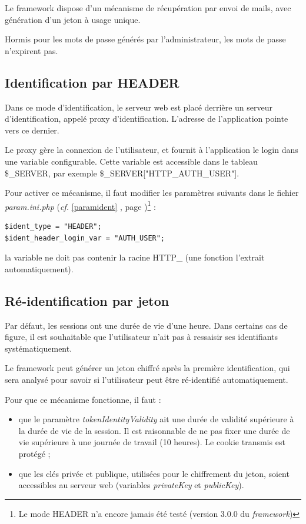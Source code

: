 Le framework dispose d'un mécanisme de récupération par envoi de mails, avec génération d'un jeton à usage unique.

Hormis pour les mots de passe générés par l'administrateur, les mots de passe n'expirent pas.

\subsection{Identification par HEADER}

Dans ce mode d'identification, le serveur web est placé derrière un serveur d'identification, appelé proxy d'identification. L'adresse de l'application pointe vers ce dernier. 

Le proxy gère la connexion de l'utilisateur, et fournit à l'application le login dans une variable configurable. Cette variable est accessible dans le tableau \$\_SERVER, par exemple \$\_SERVER["HTTP\_AUTH\_USER"].

Pour activer ce mécanisme, il faut modifier les paramètres suivants dans le fichier \textit{param.ini.php} (\textit{cf.} \ref{paramident} \textit{}, page \pageref{paramident})\footnote{Le mode HEADER n'a encore jamais été testé (version 3.0.0 du \textit{framework})} :
\begin{lstlisting}
$ident_type = "HEADER";
$ident_header_login_var = "AUTH_USER";
\end{lstlisting}

la variable ne doit pas contenir la racine HTTP\_ (une fonction l'extrait automatiquement).

\subsection{Ré-identification par jeton}

Par défaut, les sessions ont une durée de vie d'une heure. Dans certains cas de figure, il est souhaitable que l'utilisateur n'ait pas à ressaisir ses identifiants systématiquement.

Le framework peut générer un jeton chiffré après la première identification, qui sera analysé pour savoir si l'utilisateur peut être ré-identifié automatiquement.

Pour que ce mécanisme fonctionne, il faut :
\begin{itemize}
\item que le paramètre \textit{tokenIdentityValidity} ait une durée de validité supérieure à la durée de vie de la session. Il est raisonnable de ne pas fixer une durée de vie supérieure à une journée de travail (10 heures). Le cookie transmis est protégé ;
\item que les clés privée et publique, utilisées pour le chiffrement du jeton, soient accessibles au serveur web (variables \textit{privateKey} et \textit{publicKey}).
\end{itemize}

